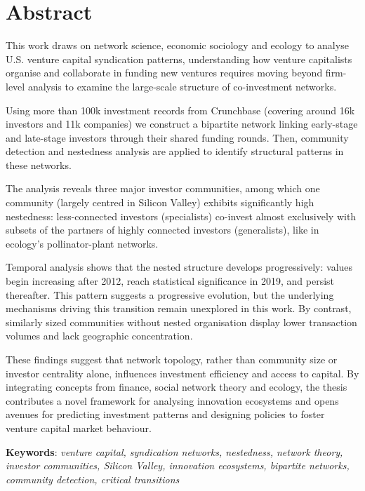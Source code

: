 \section*{Abstract}


This work draws on network science, economic sociology and ecology to analyse U.S. venture capital syndication patterns, understanding how venture capitalists organise and collaborate in funding new ventures requires moving beyond firm-level analysis to examine the large-scale structure of co-investment networks. 

Using more than 100k investment records from Crunchbase (covering around 16k investors and 11k companies) we construct a bipartite network linking early-stage and late-stage investors through their shared funding rounds. Then, community detection and nestedness analysis are applied to identify structural patterns in these networks.

The analysis reveals three major investor communities, among which one community (largely centred in Silicon Valley) exhibits significantly high nestedness: less-connected investors (specialists) co-invest almost exclusively with subsets of the partners of highly connected investors (generalists), like in ecology's pollinator-plant networks. 

Temporal analysis shows that the nested structure develops progressively: values begin increasing after 2012, reach statistical significance in 2019, and persist thereafter. This pattern suggests a progressive evolution, but the underlying mechanisms driving this transition remain unexplored in this work. By contrast, similarly sized communities without nested organisation display lower transaction volumes and lack geographic concentration.

These findings suggest that network topology, rather than community size or investor centrality alone, influences investment efficiency and access to capital. By integrating concepts from finance, social network theory and ecology, the thesis contributes a novel framework for analysing innovation ecosystems and opens avenues for predicting investment patterns and designing policies to foster venture capital market behaviour.

\vspace{\fill}

\textbf{Keywords}: \textit{venture capital, syndication networks, nestedness, network theory, investor communities, Silicon Valley, innovation ecosystems, bipartite networks, community detection, critical transitions}

\pagebreak